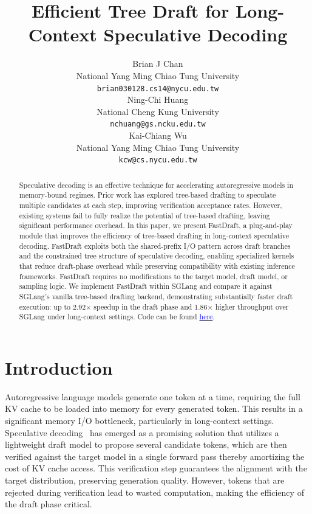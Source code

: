 \documentclass{article}
\title{Efficient Tree Draft for Long-Context Speculative Decoding}
\author{%
  Brian J Chan \\
  National Yang Ming Chiao Tung University \\
  \texttt{brian030128.cs14@nycu.edu.tw} \\
  \And
  Ning-Chi Huang \\
  National Cheng Kung University \\
  \texttt{nchuang@gs.ncku.edu.tw} \\
  \And
  Kai-Chiang Wu \\
  National Yang Ming Chiao Tung University \\
  \texttt{kcw@cs.nycu.edu.tw} \\
}
\begin{document}
\maketitle


\begin{abstract}
Speculative decoding is an effective technique for accelerating autoregressive models in memory-bound regimes. Prior work has explored tree-based drafting to speculate multiple candidates at each step, improving verification acceptance rates. However, existing systems fail to fully realize the potential of tree-based drafting, leaving significant performance overhead. In this paper, we present FastDraft, a plug-and-play module that improves the efficiency of tree-based drafting in long-context speculative decoding. FastDraft exploits both the shared-prefix I/O pattern across draft branches and the constrained tree structure of speculative decoding, enabling specialized kernels that reduce draft-phase overhead while preserving compatibility with existing inference frameworks. FastDraft requires no modifications to the target model, draft model, or sampling logic. We implement FastDraft within SGLang and compare it against SGLang's vanilla tree-based drafting backend, demonstrating substantially faster draft execution: up to 2.92$\times$ speedup in the draft phase and 1.86$\times$ higher throughput over SGLang under long-context settings. Code can be found \href{https://github.com/brian030128/fast-draft/tree/master}{\textcolor{blue}{here}}.
\end{abstract}



\section{Introduction}
Autoregressive language models generate one token at a time, requiring the full KV cache to be loaded into memory for every generated token. This results in a significant memory I/O bottleneck, particularly in long-context settings. 
Speculative decoding~\cite{chen2023acceleratinglargelanguagemodel} has emerged as a promising solution that utilizes a lightweight draft model to propose several candidate tokens, which are then verified against the target model in a single forward pass thereby amortizing the cost of KV cache access. 
This verification step guarantees the alignment with the target distribution, preserving generation quality. However, tokens that are rejected during verification lead to wasted computation, making the efficiency of the draft phase critical.
\end{document}
